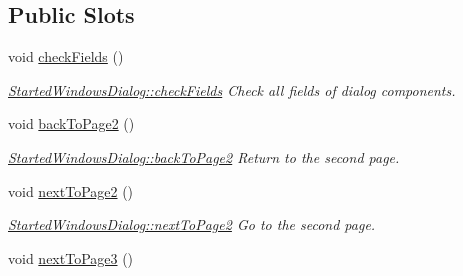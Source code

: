 \subsection*{Public Slots}
\begin{DoxyCompactItemize}
\item 
\hypertarget{classGui_1_1Dialogs_1_1StartedWindowsDialog_a9ea73c16c7917ff50c596cd1942dabfa}{void \hyperlink{classGui_1_1Dialogs_1_1StartedWindowsDialog_a9ea73c16c7917ff50c596cd1942dabfa}{check\-Fields} ()}\label{classGui_1_1Dialogs_1_1StartedWindowsDialog_a9ea73c16c7917ff50c596cd1942dabfa}

\begin{DoxyCompactList}\small\item\em \hyperlink{classGui_1_1Dialogs_1_1StartedWindowsDialog_a9ea73c16c7917ff50c596cd1942dabfa}{Started\-Windows\-Dialog\-::check\-Fields} Check all fields of dialog components. \end{DoxyCompactList}\item 
\hypertarget{classGui_1_1Dialogs_1_1StartedWindowsDialog_a690559be1b50a5ae7afc0ab64d0a28b8}{void \hyperlink{classGui_1_1Dialogs_1_1StartedWindowsDialog_a690559be1b50a5ae7afc0ab64d0a28b8}{back\-To\-Page2} ()}\label{classGui_1_1Dialogs_1_1StartedWindowsDialog_a690559be1b50a5ae7afc0ab64d0a28b8}

\begin{DoxyCompactList}\small\item\em \hyperlink{classGui_1_1Dialogs_1_1StartedWindowsDialog_a690559be1b50a5ae7afc0ab64d0a28b8}{Started\-Windows\-Dialog\-::back\-To\-Page2} Return to the second page. \end{DoxyCompactList}\item 
\hypertarget{classGui_1_1Dialogs_1_1StartedWindowsDialog_afd791a73e2d897147b31c829131942af}{void \hyperlink{classGui_1_1Dialogs_1_1StartedWindowsDialog_afd791a73e2d897147b31c829131942af}{next\-To\-Page2} ()}\label{classGui_1_1Dialogs_1_1StartedWindowsDialog_afd791a73e2d897147b31c829131942af}

\begin{DoxyCompactList}\small\item\em \hyperlink{classGui_1_1Dialogs_1_1StartedWindowsDialog_afd791a73e2d897147b31c829131942af}{Started\-Windows\-Dialog\-::next\-To\-Page2} Go to the second page. \end{DoxyCompactList}\item 
\hypertarget{classGui_1_1Dialogs_1_1StartedWindowsDialog_abac16c4f9fc0a3481565530fa01d8494}{void \hyperlink{classGui_1_1Dialogs_1_1StartedWindowsDialog_abac16c4f9fc0a3481565530fa01d8494}{next\-To\-Page3} ()}\label{classGui_1_1Dialogs_1_1StartedWindowsDialog_abac16c4f9fc0a3481565530fa01d8494}


\end{DoxyCompactItemize}
